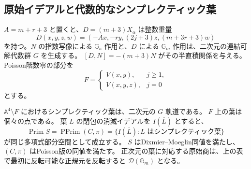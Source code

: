 \subsection{原始イデアルと代数的なシンプレクティック葉}

$A=m+r+3$ と置くと、$D=(m+3)X_\alpha$ は整数重量
\[
 D(x,y,z,w)=(-Ax,-ry,(2j+3)z,(m+3r+3)w)
\]
を持つ。$N$ の指数写像による $\mathbb G_a$ 作用と、$D$ による
$\mathbb G_m$ 作用は、二次元の連結可解代数群 $G$ を生成する。
$[D,N]=-(m+3)N$ がその半直積関係を与える。
Poisson階数零の部分を
\[
 F=\begin{cases}V(x,y),&j\ge1,\\V(x,y,z),&j=0\end{cases}
\]
とする。

\begin{theorem}
\label{thm:primitive-leaf-space-v37}
$\mathbb A^4\setminus F$ におけるシンプレクティック葉は、二次元の $G$ 軌道である。
$F$ 上の葉は個々の点である。
葉 $L$ の閉包の消滅イデアルを $I(\overline L)$ とすると、
\[
 \operatorname{Prim}S
 =\operatorname{PPrim}(C,\pi)
 =\{I(\overline L):L\text{ はシンプレクティック葉}\}
\]
が同じ多項式部分空間として成立する。
$S$ はDixmier--Moeglin同値を満たし、$(C,\pi)$ はPoisson版の同値を満たす。
正次元の葉に対応する原始商は、上の表で最初に反転可能な正規元を反転すると
$\mathcal D(\mathbb G_m)$ となる。
\end{theorem}


